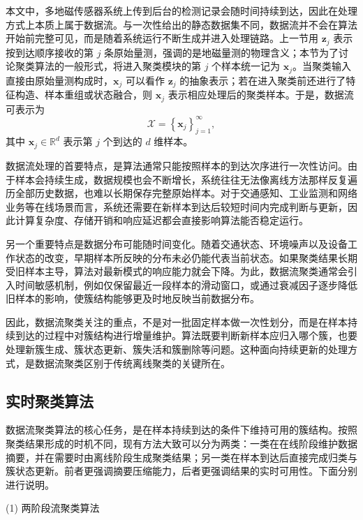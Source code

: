 \documentclass{xdupgthesis}
\begin{document}
本文中，多地磁传感器系统上传到后台的检测记录会随时间持续到达，因此在处理方式上本质上属于数据流。与一次性给出的静态数据集不同，数据流并不会在算法开始前完整可见，而是随着系统运行不断生成并进入处理链路。上一节用 $\mathbf z_j$ 表示按到达顺序接收的第 $j$ 条原始量测，强调的是地磁量测的物理含义；本节为了讨论聚类算法的一般形式，将进入聚类模块的第 $j$ 个样本统一记为 $\mathbf x_j$。当聚类输入直接由原始量测构成时，$\mathbf x_j$ 可以看作 $\mathbf z_j$ 的抽象表示；若在进入聚类前还进行了特征构造、样本重组或状态融合，则 $\mathbf x_j$ 表示相应处理后的聚类样本。于是，数据流可表示为
\begin{equation}
	\mathcal{X}=\left\{\mathbf{x}_j\right\}_{j=1}^{\infty},
\end{equation}
其中 $\mathbf{x}_j\in\mathbb{R}^d$ 表示第 $j$ 个到达的 $d$ 维样本。

数据流处理的首要特点，是算法通常只能按照样本的到达次序进行一次性访问。由于样本会持续生成，数据规模也会不断增长，系统往往无法像离线方法那样反复遍历全部历史数据，也难以长期保存完整原始样本。对于交通感知、工业监测和网络业务等在线场景而言，系统还需要在新样本到达后较短时间内完成判断与更新，因此计算复杂度、存储开销和响应延迟都会直接影响算法能否稳定运行。

另一个重要特点是数据分布可能随时间变化。随着交通状态、环境噪声以及设备工作状态的改变，早期样本所反映的分布未必仍能代表当前状态。如果聚类结果长期受旧样本主导，算法对最新模式的响应能力就会下降。为此，数据流聚类通常会引入时间敏感机制，例如仅保留最近一段样本的滑动窗口，或通过衰减因子逐步降低旧样本的影响，使簇结构能够更及时地反映当前数据分布。

因此，数据流聚类关注的重点，不是对一批固定样本做一次性划分，而是在样本持续到达的过程中对簇结构进行增量维护。算法既要判断新样本应归入哪个簇，也要处理新簇生成、簇状态更新、簇失活和簇删除等问题。这种面向持续更新的处理方式，是数据流聚类区别于传统离线聚类的关键所在。

\subsection{实时聚类算法}

数据流聚类算法的核心任务，是在样本持续到达的条件下维持可用的簇结构。按照聚类结果形成的时机不同，现有方法大致可以分为两类：一类在在线阶段维护数据摘要，并在需要时由离线阶段生成聚类结果；另一类在样本到达后直接完成归类与簇状态更新。前者更强调摘要压缩能力，后者更强调结果的实时可用性。下面分别进行说明。


\textnormal{(1) 两阶段流聚类算法}\par\vspace{0.3\baselineskip}
\end{document}
